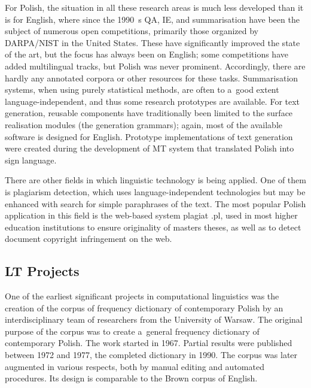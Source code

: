 \begin{multicols}{2}
For Polish, the situation in all these research areas is much less
developed than it is for English, where since the 1990~s QA, IE, and
summarisation have been the subject of numerous open competitions,
primarily those organized by DARPA/NIST in the United States. These
have significantly improved the state of the art, but the focus has
always been on English; some competitions have added multilingual
tracks, but Polish was never prominent. Accordingly, there are hardly
any annotated corpora or other resources for these tasks.
Summarisation systems, when using purely statistical methods, are
often to a~good extent language-independent, and thus some research
prototypes are available. For text generation, reusable components
have traditionally been limited to the surface realisation modules
(the {\textquotedbl}generation grammars{\textquotedbl}); again, most
of the available software is designed for English. Prototype
implementations of text generation were created during the development
of MT system that translated Polish into sign language. 

There are other fields in which linguistic technology is being
applied. One of them is plagiarism detection, which uses
language-independent technologies but may be enhanced with search for
simple paraphrases of the text. The most popular Polish application in
this field is the web-based system plagiat .pl, used in most higher
education institutions to ensure originality of
master{\textquotesingle}s theses, as well as to detect document
copyright infringement on the web. 

\subsection[LT Projects]{LT Projects} 

One of the earliest significant projects in computational linguistics
was the creation of the corpus of frequency dictionary of contemporary
Polish by an interdisciplinary team of researchers from the University
of Warsaw. The original purpose of the corpus was to create a~general
frequency dictionary of contemporary Polish. The work started in 1967.
Partial results were published between 1972 and 1977, the completed
dictionary in 1990. The corpus was later augmented in various
respects, both by manual editing and automated procedures. Its design
is comparable to the Brown corpus of English. 


\end{multicols}
